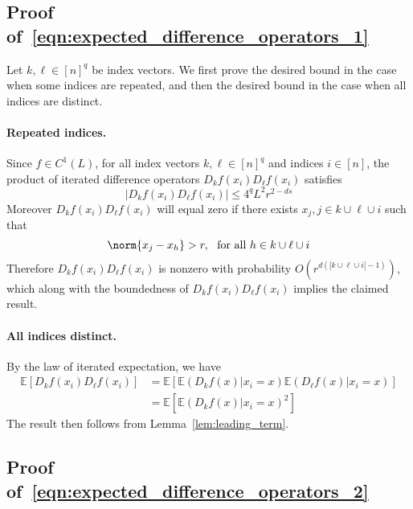 \documentclass{article}
\newcommand{\abs}[1]{\left \lvert #1 \right \rvert}
\newcommand{\1}{\mathbf{1}}
\newcommand{\Ebb}{\mathbb{E}}
\theoremstyle{alden}
\theoremstyle{aldenthm}
\theoremstyle{definition}
\theoremstyle{remark}
\begin{document}
\subsection{Proof of~\eqref{eqn:expected_difference_operators_1}}

Let $k,\ell \in [n]^q$ be index vectors. We first prove the desired bound in the case when some indices are repeated, and then the desired bound in the case when all indices are distinct.

\paragraph{Repeated indices.}

Since $f \in C^1(L)$, for all index vectors $k,\ell \in [n]^q$ and indices $i \in [n]$, the product of iterated difference operators $D_kf(x_i) D_{\ell}f(x_i)$ satisfies
\begin{equation*}
\abs{D_kf(x_i) D_{\ell}f(x_i)} \leq 4^{q} L^2 r^{2 - ds}
\end{equation*}
Moreover $D_kf(x_i) D_{\ell}f(x_i)$ will equal zero if there exists $x_j, j \in k \cup \ell \cup i$ such that
\begin{equation*}
\norm{x_j - x_h} > r,~~\textrm{for all $h \in k \cup \ell \cup i$}
\end{equation*}
Therefore $D_kf(x_i) D_{\ell}f(x_i)$ is nonzero with probability $O(r^{d(\abs{k \cup \ell \cup i} - 1)})$, which along with the boundedness of $D_kf(x_i) D_{\ell}f(x_i)$ implies the claimed result.

\paragraph{All indices distinct.}

By the law of iterated expectation, we have
\begin{align}
\Ebb\left[D_kf(x_i)D_{\ell}f(x_i)\right] & = \Ebb\left[\Ebb\left(D_kf(x)|x_i = x\right) \Ebb\left(D_{\ell}f(x)|x_i = x\right)\right] \nonumber \\
& = \Ebb\left[\Ebb\left(D_kf(x)|x_i = x\right)^2\right] \label{eqn:expected_difference_operators_pf1}
\end{align}
The result then follows from Lemma~\ref{lem:leading_term}.

\subsection{Proof of~\eqref{eqn:expected_difference_operators_2}}
\end{document}
